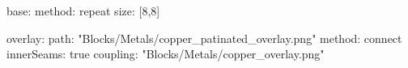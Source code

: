 base:
  method: repeat
  size: [8,8]
  
overlay:
  path: "Blocks/Metals/copper_patinated_overlay.png"
  method: connect
  innerSeams: true
  coupling: "Blocks/Metals/copper_overlay.png"